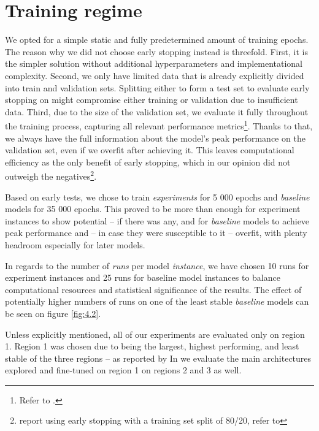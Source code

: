 \section{Training regime}\label{ch:4.4}

We opted for a simple static and fully predetermined amount of training epochs. The reason why we did not choose early stopping instead is threefold. First, it is the simpler solution without additional hyperparameters and implementational complexity. Second, we only have limited data that is already explicitly divided into train and validation sets. Splitting either to form a test set to evaluate early stopping on might compromise either training or validation due to insufficient data. Third, due to the size of the validation set, we evaluate it fully throughout the training process, capturing all relevant performance metrics\footnote{Refer to .}. Thanks to that, we always have the full information about the model’s peak performance on the validation set, even if we overfit after achieving it. This leaves computational efficiency as the only benefit of early stopping, which in our opinion did not outweigh the negatives\footnote{\cite{klindt} report using early stopping with a training set split of 80/20, refer to }.

Based on early tests, we chose to train \textit{experiments} for 5 000 epochs and \textit{baseline} models for 35 000 epochs. This proved to be more than enough for experiment instances to show potential -- if there was any, and for \textit{baseline} models to achieve peak performance and -- in case they were susceptible to it -- overfit, with plenty headroom especially for later models. 

In regards to the number of \textit{runs} per model \textit{instance}, we have chosen 10 runs for experiment instances and 25 runs for baseline model instances to balance computational resources and statistical significance of the results. The effect of potentially higher numbers of runs on one of the least stable \textit{baseline} models can be seen on figure \ref{fig:4.2}.

Unless explicitly mentioned, all of our experiments are evaluated only on region 1. Region 1 was chosen due to being the largest, highest performing, and least stable of the three regions -- as reported by \citeauthor{antolik} In  we evaluate the main architectures explored and fine-tuned on region 1 on regions 2 and 3 as well.

